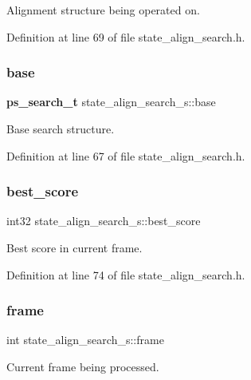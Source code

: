 Alignment structure being operated on. 



Definition at line 69 of file state\+\_\+align\+\_\+search.\+h.

\mbox{\label{structstate__align__search__s_ab2a596d687e113c88a271d1397b8d9c5}} 
\subsubsection{base}
{\footnotesize\ttfamily \textbf{ ps\+\_\+search\+\_\+t} state\+\_\+align\+\_\+search\+\_\+s\+::base}



Base search structure. 



Definition at line 67 of file state\+\_\+align\+\_\+search.\+h.

\mbox{\label{structstate__align__search__s_a1810f343c6ae382f5ed0a5eb02d33037}} 
\subsubsection{best\+\_\+score}
{\footnotesize\ttfamily int32 state\+\_\+align\+\_\+search\+\_\+s\+::best\+\_\+score}



Best score in current frame. 



Definition at line 74 of file state\+\_\+align\+\_\+search.\+h.

\mbox{\label{structstate__align__search__s_aa520abfdb4d0bca2b769f281839637a9}} 
\subsubsection{frame}
{\footnotesize\ttfamily int state\+\_\+align\+\_\+search\+\_\+s\+::frame}



Current frame being processed. 



